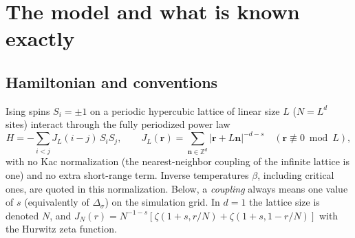 \documentclass[10pt,a4paper]{article}
\newcommand{\Ds}{\Delta_\sigma}
\begin{document}
\section{The model and what is known exactly}\label{sec:model}
\subsection{Hamiltonian and conventions}
Ising spins $S_i=\pm1$ on a periodic hypercubic lattice of linear size $L$ ($N=L^d$ sites) interact through the fully periodized power law
\begin{equation}
 H=-\sum_{i<j}J_L(i-j)\,S_iS_j,\qquad J_L(\mathbf r)=\sum_{\mathbf n\in\mathbb Z^d}|\mathbf r+L\mathbf n|^{-d-s}\quad(\mathbf r\not\equiv0\bmod L),
 \label{eq:H}
\end{equation}
with no Kac normalization (the nearest-neighbor coupling of the infinite lattice is one) and no extra short-range term. Inverse temperatures
$\beta$, including critical ones, are quoted in this normalization. Below, a \emph{coupling} always means one value of $s$ (equivalently of
$\Ds$) on the simulation grid. In $d=1$ the lattice size is denoted $N$, and
$J_N(r)=N^{-1-s}[\zeta(1+s,r/N)+\zeta(1+s,1-r/N)]$ with the Hurwitz zeta function.
\end{document}
